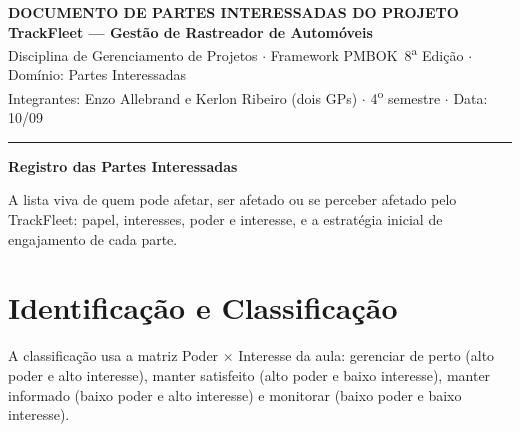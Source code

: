 \documentclass[11pt,a4paper]{article}
\newcommand{\cabecalho}[3]{%
  \begin{center}
  {\Large\bfseries DOCUMENTO DE #1 DO PROJETO}\\[2pt]
  {\large\bfseries TrackFleet --- Gestão de Rastreador de Automóveis}\\[4pt]
  Disciplina de Gerenciamento de Projetos $\cdot$ Framework PMBOK\textregistered\ 8\textsuperscript{a} Edição $\cdot$ Domínio: #2\\[2pt]
  Integrantes: Enzo Allebrand e Kerlon Ribeiro (dois GPs) $\cdot$ 4\textsuperscript{o} semestre $\cdot$ Data: #3
  \end{center}
  \vspace{2mm}\hrule\vspace{4mm}}
\newcommand{\parte}[1]{\noindent\textbf{\large #1}\par\vspace{1mm}}
\begin{document}
\cabecalho{PARTES INTERESSADAS}{Partes Interessadas}{10/09}

\parte{Registro das Partes Interessadas}
\noindent A lista viva de quem pode afetar, ser afetado ou se perceber afetado pelo TrackFleet: papel, interesses, poder e interesse, e a estratégia inicial de engajamento de cada parte.

\section{Identificação e Classificação}
A classificação usa a matriz Poder $\times$ Interesse da aula: gerenciar de perto (alto poder e alto interesse), manter satisfeito (alto poder e baixo interesse), manter informado (baixo poder e alto interesse) e monitorar (baixo poder e baixo interesse).
\end{document}
